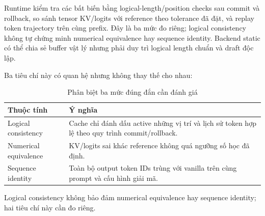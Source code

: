 Runtime kiểm tra các bất biến bằng logical-length/position checks sau commit và rollback, so sánh tensor KV/logits với reference theo tolerance đã đặt, và replay token trajectory trên cùng prefix. Đây là ba mức đo riêng; logical consistency không tự chứng minh numerical equivalence hay sequence identity. Backend static có thể chia sẻ buffer vật lý nhưng phải duy trì logical length chuẩn và draft độc lập.

Ba tiêu chí này có quan hệ nhưng không thay thế cho nhau:
\begin{table}[H]
\centering
\caption{Phân biệt ba mức đúng đắn cần đánh giá}\label{tab:kv-correctness-levels}
\small
\begin{tabular}{p{3.2cm} p{10.8cm}}
\toprule
\textbf{Thuộc tính} & \textbf{Ý nghĩa} \\
\midrule
Logical consistency & Cache chỉ đánh dấu active những vị trí và lịch sử token hợp lệ theo quy trình commit/rollback. \\
Numerical equivalence & KV/logits sai khác reference không quá ngưỡng số học đã định. \\
Sequence identity & Toàn bộ output token IDs trùng với vanilla trên cùng prompt và cấu hình giải mã. \\
\bottomrule
\end{tabular}
\end{table}
Logical consistency không bảo đảm numerical equivalence hay sequence identity; hai tiêu chí này cần đo riêng.

